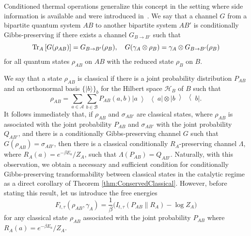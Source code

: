 \documentclass[aps,pra,11pt,onecolumn,nofootinbib,tightenlines]{revtex4-2}
\theoremstyle{definition}
\newcommand{\mc}[1]{\mathcal{#1}}
\newcommand{\ketbra}[2]{\left|#1\middle\rangle\middle\langle #2\right|}
\newcommand{\ptr}[2]{{\rm Tr}_{#1}\left[#2\right]}
\begin{document}
Conditioned thermal operations generalize this concept in the setting where side information is available and were introduced in~\cite{narasimhachar2017resource}. We say that a channel $G$ from a bipartite quantum system $AB$ to another bipartite system $AB'$ is conditionally Gibbs-preserving if there exists a channel $G_{B\to B'}$ such that
\begin{equation}
\ptr{A}{G(\rho_{AB})}=G_{B\to B'}(\rho_B),\quad G(\gamma_A\otimes\rho_B)=\gamma_A\otimes G_{B\to B'}(\rho_B)
\end{equation}
for all quantum states $\rho_{AB}$ on $AB$ with the reduced state $\rho_B$ on $B$.

We say that a state $\rho_{AB}$ is classical if there is a joint probability distribution $P_{AB}$ and an orthonormal basis $\{|b\rangle\}_b$ for the Hilbert space $\mc H_B$ of $B$ such that
\begin{equation}
\rho_{AB}=\sum_{a\in\mc A}\sum_{b\in\mc B}P_{AB}(a,b)\ketbra{a}{a}\otimes\ketbra{b}{b}.
\end{equation}
It follows immediately that, if $\rho_{AB}$ and $\sigma_{AB'}$ are classical states, where $\rho_{AB}$ is associated with the joint probability $P_{AB}$ and $\sigma_{AB'}$ with the joint probability $Q_{AB'}$, and there is a conditionally Gibbs-preserving channel $G$ such that $G(\rho_{AB})=\sigma_{AB'}$, then there is a classical conditionally $R_A$-preserving channel $\Lambda$, where $R_A(a)=e^{-\beta E_a}/Z_A$, such that $\Lambda(P_{AB})=Q_{AB'}$. Naturally, with this observation, we obtain a necessary and sufficient condition for conditionally Gibbs-preserving transformability between classical states in the catalytic regime as a direct corollary of Theorem \ref{thm:ConservedClassical}. However, before stating this result, let us introduce the free energies
\begin{equation}
F_{t,\tau}(\rho_{AB},\gamma_A)=\frac{1}{\beta}\big(I_{t,\tau}(P_{AB}\|R_A)-\log{Z_A}\big)
\end{equation}
for any classical state $\rho_{AB}$ associated with the joint probability $P_{AB}$ where $R_A(a)=e^{-\beta E_a}/Z_A$.
\end{document}

